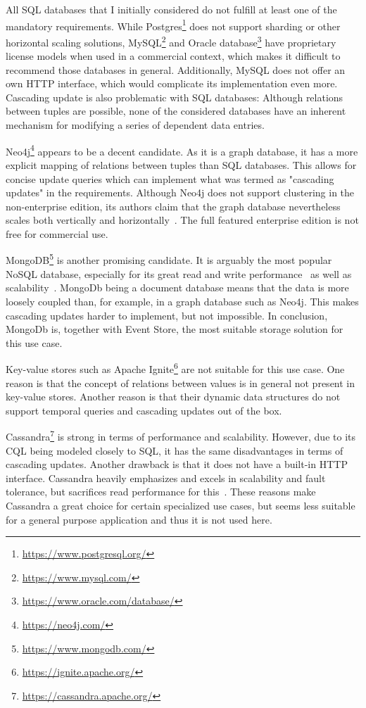 All \ac{SQL} databases that I initially considered do not fulfill at least one of the mandatory requirements.
While Postgres\footnote{\url{https://www.postgresql.org/}} does not support sharding or other horizontal scaling solutions, MySQL\footnote{\url{https://www.mysql.com/}} and Oracle database\footnote{\url{https://www.oracle.com/database/}} have proprietary license models when used in a commercial context, which makes it difficult to recommend those databases in general.
Additionally, MySQL does not offer an own HTTP interface, which would complicate its implementation even more.
Cascading update is also problematic with \ac{SQL} databases: Although relations between tuples are possible, none of the considered databases have an inherent mechanism for modifying a series of dependent data entries.

Neo4j\footnote{\url{https://neo4j.com/}} appears to be a decent candidate.
As it is a graph database, it has a more explicit mapping of relations between tuples than \ac{SQL} databases.
This allows for concise update queries which can implement what was termed as "cascading updates" in the requirements.
Although Neo4j does not support clustering in the non-enterprise edition, its authors claim that the graph database nevertheless scales both vertically and horizontally~\cite{...}.
The full featured enterprise edition is not free for commercial use.

MongoDB\footnote{\url{https://www.mongodb.com/}} is another promising candidate.
It is arguably the most popular NoSQL database, especially for its great read and write performance~\cite{6625441,...} as well as scalability~\cite{...}.
MongoDb being a document database means that the data is more loosely coupled than, for example, in a graph database such as Neo4j.
This makes cascading updates harder to implement, but not impossible.
In conclusion, MongoDb is, together with Event Store, the most suitable storage solution for this use case.

Key-value stores such as Apache Ignite\footnote{\url{https://ignite.apache.org/}} are not suitable for this use case.
One reason is that the concept of relations between values is in general not present in key-value stores.
Another reason is that their dynamic data structures do not support temporal queries and cascading updates out of the box.

Cassandra\footnote{\url{https://cassandra.apache.org/}} is strong in terms of performance and scalability.
However, due to its \ac{CQL} being modeled closely to \ac{SQL}, it has the same disadvantages in terms of cascading updates.
Another drawback is that it does not have a built-in HTTP interface.
Cassandra heavily emphasizes and excels in scalability and fault tolerance, but sacrifices read performance for this~\cite{6625441}.
These reasons make Cassandra a great choice for certain specialized use cases, but seems less suitable for a general purpose application and thus it is not used here.

